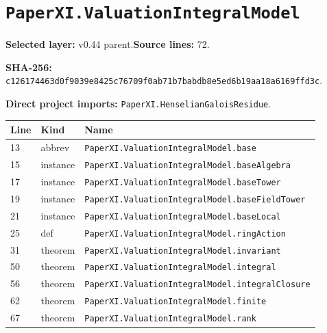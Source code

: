 \documentclass[10pt,oneside]{book}
\begin{document}
\section{\texorpdfstring{\nolinkurl{PaperXI.ValuationIntegralModel}}{PaperXI.ValuationIntegralModel}}\label{module:PaperXI.ValuationIntegralModel}

\textbf{Selected layer:} v0.44 parent.\quad\textbf{Source lines:} 72.\par\textbf{SHA-256:} {\scriptsize\nolinkurl{c126174463d0f9039e8425c76709f0ab71b7babdb8e5ed6b19aa18a6169ffd3c}}.


\textbf{Direct project imports:} \nolinkurl{PaperXI.HenselianGaloisResidue}.

\begin{longtable}{@{}p{}p{}p{}@{}}\toprule Line&Kind&Name\\\midrule\endhead

13&abbrev&\nolinkurl{PaperXI.ValuationIntegralModel.base}\\

15&instance&\nolinkurl{PaperXI.ValuationIntegralModel.baseAlgebra}\\

17&instance&\nolinkurl{PaperXI.ValuationIntegralModel.baseTower}\\

19&instance&\nolinkurl{PaperXI.ValuationIntegralModel.baseFieldTower}\\

21&instance&\nolinkurl{PaperXI.ValuationIntegralModel.baseLocal}\\

25&def&\nolinkurl{PaperXI.ValuationIntegralModel.ringAction}\\

31&theorem&\nolinkurl{PaperXI.ValuationIntegralModel.invariant}\\

50&theorem&\nolinkurl{PaperXI.ValuationIntegralModel.integral}\\

56&theorem&\nolinkurl{PaperXI.ValuationIntegralModel.integralClosure}\\

62&theorem&\nolinkurl{PaperXI.ValuationIntegralModel.finite}\\

67&theorem&\nolinkurl{PaperXI.ValuationIntegralModel.rank}\\

\bottomrule\end{longtable}
\end{document}

